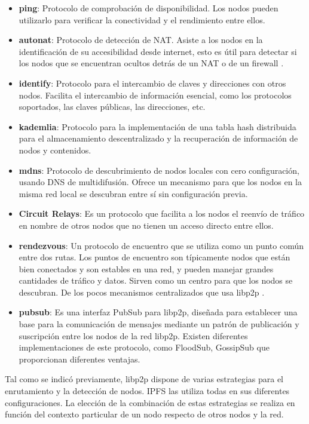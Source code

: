 \begin{itemize}[itemsep=1pt,nolistsep]
      \item \textbf{ping}: Protocolo de comprobación de disponibilidad. Los nodos pueden utilizarlo para verificar la conectividad y el rendimiento entre ellos.
      \item \textbf{autonat}: Protocolo de detección de NAT. Asiste a los nodos en la identificación de su accesibilidad desde internet, esto es útil para detectar si los nodos que se encuentran ocultos detrás de un NAT o de un firewall \cite{AutoNAT}.
      \item \textbf{identify}: Protocolo para el intercambio de claves y direcciones con otros nodos. Facilita el intercambio de información esencial, como los protocolos soportados, las claves públicas, las direcciones, etc.
      \item \textbf{kademlia}: Protocolo para la implementación de una tabla hash distribuida para el almacenamiento descentralizado y la recuperación de información de nodos y contenidos.
      \item \textbf{mdns}: Protocolo de descubrimiento de nodos locales con cero configuración, usando DNS de multidifusión. Ofrece un mecanismo para que los nodos en la misma red local se descubran entre sí sin configuración previa.
      \item \textbf{Circuit Relays}: Es un protocolo que facilita a los nodos el reenvío de tráfico en nombre de otros nodos que no tienen un acceso directo entre ellos\cite{CircuitRelay}.
      \item \textbf{rendezvous}: Un protocolo de encuentro que se utiliza como un punto común entre dos rutas.
            Los puntos de encuentro son típicamente nodos que están bien conectados y son estables en una red, y pueden manejar grandes cantidades de tráfico y datos. Sirven como un centro para que los nodos se descubran. De los pocos mecanismos centralizados que usa libp2p \cite{Rendezvous}.
      \item \textbf{pubsub}: Es una interfaz PubSub para libp2p, diseñada para establecer una base para la comunicación de mensajes mediante un patrón de publicación y suscripción entre los nodos de la red libp2p. Existen diferentes implementaciones de este protocolo, como FloodSub, GossipSub que proporcionan
            diferentes ventajas.
\end{itemize}

Tal como se indicó previamente, libp2p dispone de varias estrategias para el enrutamiento y la detección de nodos. IPFS las utiliza todas en sus diferentes configuraciones. La elección de la combinación de estas estrategias se realiza en función del contexto particular de un nodo respecto de
otros nodos y la red.

